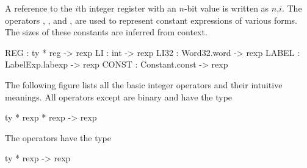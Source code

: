 A reference to the $i$th 
integer register with an $n$-bit value is written 
as $n$,$i$\sml{)}.  The operators , ,
and ,  are used to represent constant expressions 
of various forms.  The sizes of these constants are inferred from context.
\begin{SML}  
  REG   : ty * reg -> rexp
  LI    : int -> rexp
  LI32  : Word32.word -> rexp
  LABEL : LabelExp.labexp -> rexp
  CONST : Constant.const -> rexp
\end{SML}

The following figure lists all the basic integer operators and their
intuitive meanings.  All operators except  are binary 
and have the type
\begin{SML}
  ty * rexp * rexp -> rexp
\end{SML}
The operators  have the type
\begin{SML}
  ty * rexp -> rexp
\end{SML}

